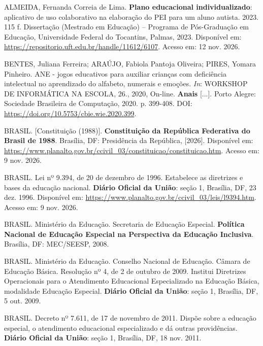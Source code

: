

\begin{referenciasIFTO}
ALMEIDA, Fernanda Correia de Lima. \textbf{Plano educacional individualizado}: aplicativo de uso colaborativo na elaboração do PEI para um aluno autista. 2023. 115 f. Dissertação (Mestrado em Educação) – Programa de Pós-Graduação em Educação, Universidade Federal do Tocantins, Palmas, 2023. Disponível em: \url{https://repositorio.uft.edu.br/handle/11612/6107}. Acesso em: 12 nov. 2026.

BENTES, Juliana Ferreira; ARAÚJO, Fabiola Pantoja Oliveira; PIRES, Yomara Pinheiro. ANE - jogos educativos para auxiliar crianças com deficiência intelectual no aprendizado do alfabeto, numerais e emoções. \textit{In}: WORKSHOP DE INFORMÁTICA NA ESCOLA, 26., 2020, On-line. \textbf{Anais} [...]. Porto Alegre: Sociedade Brasileira de Computação, 2020. p. 399-408. DOI: \url{https://doi.org/10.5753/cbie.wie.2020.399}.

BRASIL. [Constituição (1988)]. \textbf{Constituição da República Federativa do Brasil de 1988}. Brasília, DF: Presidência da República, [2026]. Disponível em: \url{https://www.planalto.gov.br/ccivil_03/constituicao/constituicao.htm}. Acesso em: 9 nov. 2026.

BRASIL. Lei nº 9.394, de 20 de dezembro de 1996. Estabelece as diretrizes e bases da educação nacional. \textbf{Diário Oficial da União}: seção 1, Brasília, DF, 23 dez. 1996. Disponível em: \url{https://www.planalto.gov.br/ccivil_03/leis/l9394.htm}. Acesso em: 9 nov. 2026.

BRASIL. Ministério da Educação. Secretaria de Educação Especial. \textbf{Política Nacional de Educação Especial na Perspectiva da Educação Inclusiva}. Brasília, DF: MEC/SEESP, 2008.

BRASIL. Ministério da Educação. Conselho Nacional de Educação. Câmara de Educação Básica. Resolução nº 4, de 2 de outubro de 2009. Institui Diretrizes Operacionais para o Atendimento Educacional Especializado na Educação Básica, modalidade Educação Especial. \textbf{Diário Oficial da União}: seção 1, Brasília, DF, 5 out. 2009.

BRASIL. Decreto nº 7.611, de 17 de novembro de 2011. Dispõe sobre a educação especial, o atendimento educacional especializado e dá outras providências. \textbf{Diário Oficial da União}: seção 1, Brasília, DF, 18 nov. 2011.


\end{referenciasIFTO}
